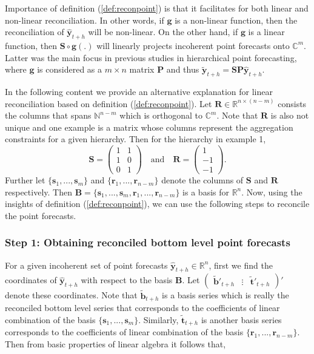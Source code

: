\documentclass[a4paper, 11pt]{article}
\begin{document}
Importance of definition (\ref{def:reconpoint}) is that it facilitates for both linear and non-linear reconciliation. In other words, if $\bm{g}$ is a non-linear function, then the reconciliation of $\hat{\bm{y}}_{t+h}$ will be non-linear. On the other hand, if $\bm{g}$ is a linear function, then $\bm{S}\circ \bm{g}(.)$ will linearly projects incoherent point forecasts onto $\bm{\mathbb{C}}^m$. Latter was the main focus in previous studies in hierarchical point forecasting, where $\bm{g}$ is considered as a $m \times n$ matrix $\bm{P}$ and thus $\tilde{\bm{y}}_{t+h}=\bm{S}\bm{P} \hat{\bm{y}}_{t+h}$. 

In the following content we provide an alternative explanation for linear reconciliation based on definition (\ref{def:reconpoint}). Let $\bm{R} \in \bm{\mathbb{R}}^{n \times (n-m)}$ consists the columns that spans $\bm{\mathbb{N}}^{n-m}$ which is orthogonal to $\bm{\mathbb{C}}^m$. Note that $\bm{R}$ is also not unique and one example is a matrix whose columns represent the aggregation constraints for a given hierarchy. Then for the hierarchy in example 1, 
$$ 
\bm{S} = 
\begin{pmatrix} 
1& 1 \\ 1 & 0 \\ 0&1 
\end{pmatrix} 
\quad \text{and} \quad 
\bm{R} = 
\begin{pmatrix}  
1 \\ -1 \\ -1 
\end{pmatrix}.
$$ 
\noindent
Further let $\{\bm{s}_1,...,\bm{s}_m\}$ and $\{\bm{r}_1,...,\bm{r}_{n-m}\}$ denote the columns of $\bm{S}$ and $\bm{R}$ respectively. Then $\bm{B}=\{\bm{s}_1,...,\bm{s}_m, \bm{r}_1,...,\bm{r}_{n-m}\}$ is a basis for $\bm{\mathbb{R}}^n$. Now, using the insights of definition (\ref{def:reconpoint}), we can use the following steps to reconcile the point forecasts.

\subsubsection*{Step 1: Obtaining reconciled bottom level point forecasts}

For a given incoherent set of point forecasts $\hat{\bm{y}}_{t+h} \in \bm{\mathbb{R}}^n$, first we find the coordinates of $\hat{\bm{y}}_{t+h}$ with respect to the basis $\bm{B}$. Let $\begin{pmatrix}\tilde{\bm{b}}'_{t+h} & \vdots& \tilde{\bm{t}}'_{t+h}\end{pmatrix}'$ denote these coordinates. Note that $\tilde{\bm{b}}_{t+h}$ is a basis series which is really the reconciled bottom level series that corresponds to the coefficients of linear combination of the basis $\{\bm{s}_1,...,\bm{s}_m\}$. Similarly, $\tilde{\bm{t}}_{t+h}$ is another basis series corresponds to the coefficients of linear combination of the basis $\{\bm{r}_1,...,\bm{r}_{n-m}\}$. Then from basic properties of linear algebra it follows that, 
\end{document}
